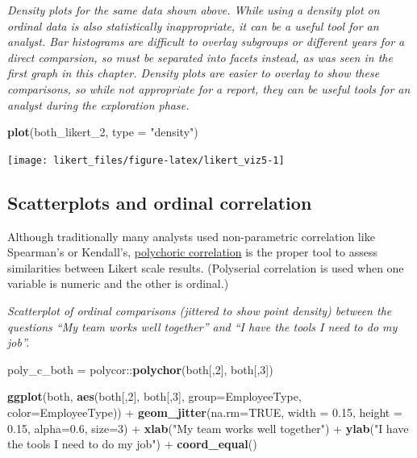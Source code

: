\documentclass[]{book}
\newenvironment{Shaded}{\begin{snugshade}}{\end{snugshade}}
\newcommand{\KeywordTok}[1]{\textcolor[rgb]{0.13,0.29,0.53}{\textbf{{#1}}}}
\newcommand{\DataTypeTok}[1]{\textcolor[rgb]{0.13,0.29,0.53}{{#1}}}
\newcommand{\DecValTok}[1]{\textcolor[rgb]{0.00,0.00,0.81}{{#1}}}
\newcommand{\FloatTok}[1]{\textcolor[rgb]{0.00,0.00,0.81}{{#1}}}
\newcommand{\StringTok}[1]{\textcolor[rgb]{0.31,0.60,0.02}{{#1}}}
\newcommand{\OtherTok}[1]{\textcolor[rgb]{0.56,0.35,0.01}{{#1}}}
\newcommand{\NormalTok}[1]{{#1}}
\begin{document}
\emph{Density plots for the same data shown above. While using a density
plot on ordinal data is also statistically inappropriate, it can be a
useful tool for an analyst. Bar histograms are difficult to overlay
subgroups or different years for a direct comparsion, so must be
separated into facets instead, as was seen in the first graph in this
chapter. Density plots are easier to overlay to show these comparisons,
so while not appropriate for a report, they can be useful tools for an
analyst during the exploration phase.}

\begin{Shaded}
\begin{Highlighting}[]
\KeywordTok{plot}\NormalTok{(both_likert_2, }\DataTypeTok{type =} \StringTok{"density"}\NormalTok{)}
\end{Highlighting}
\end{Shaded}

\begin{center}\texttt{[image: likert\_files/figure-latex/likert\_viz5-1]} \end{center}

\subsection{Scatterplots and ordinal
correlation}\label{scatterplots-and-ordinal-correlation}

Although traditionally many analysts used non-parametric correlation
like Spearman's or Kendall's,
\href{https://en.wikipedia.org/wiki/Polychoric_correlation}{polychoric
correlation} is the proper tool to assess similarities between Likert
scale results. (Polyserial correlation is used when one variable is
numeric and the other is ordinal.)

\emph{Scatterplot of ordinal comparisons (jittered to show point
density) between the questions ``My team works well together'' and ``I
have the tools I need to do my job''.}

\begin{Shaded}
\begin{Highlighting}[]
\NormalTok{poly_c_both =}\StringTok{ }\NormalTok{polycor::}\KeywordTok{polychor}\NormalTok{(both[,}\DecValTok{2}\NormalTok{], both[,}\DecValTok{3}\NormalTok{])}

\KeywordTok{ggplot}\NormalTok{(both, }\KeywordTok{aes}\NormalTok{(both[,}\DecValTok{2}\NormalTok{], both[,}\DecValTok{3}\NormalTok{], }\DataTypeTok{group=}\NormalTok{EmployeeType, }\DataTypeTok{color=}\NormalTok{EmployeeType)) +}
\StringTok{  }\KeywordTok{geom_jitter}\NormalTok{(}\DataTypeTok{na.rm=}\OtherTok{TRUE}\NormalTok{, }\DataTypeTok{width =} \FloatTok{0.15}\NormalTok{, }\DataTypeTok{height =} \FloatTok{0.15}\NormalTok{, }\DataTypeTok{alpha=}\FloatTok{0.6}\NormalTok{, }\DataTypeTok{size=}\DecValTok{3}\NormalTok{) +}
\StringTok{  }\KeywordTok{xlab}\NormalTok{(}\StringTok{"My team works well together"}\NormalTok{) +}\StringTok{ }
\StringTok{  }\KeywordTok{ylab}\NormalTok{(}\StringTok{"I have the tools I need to do my job"}\NormalTok{) +}
\StringTok{  }\KeywordTok{coord_equal}\NormalTok{()}
\end{Highlighting}
\end{Shaded}
\end{document}
